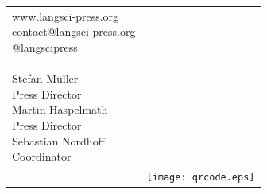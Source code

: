 \documentclass[
notumble,
nofoldmark,
]{leaflet}
\begin{document}
\setlength{\tabcolsep}{0pt}
\begin{tabular}{ll}
 
\parbox{.64\textwidth}{www.langsci-press.org\\
contact@langsci-press.org\\
@langscipress \\
\\
Stefan M\"uller 
{\\\scriptsize Press Director}
\\
Martin Haspelmath
{\\\scriptsize Press Director}\\
Sebastian Nordhoff  
{\\\scriptsize Coordinator}
}&
\\%
&
\parbox[b][0cm][b]{0cm}{
\texttt{[image: qrcode.eps]}  
}
\end{tabular}

 







% 

 

\loggingall
\end{document}
